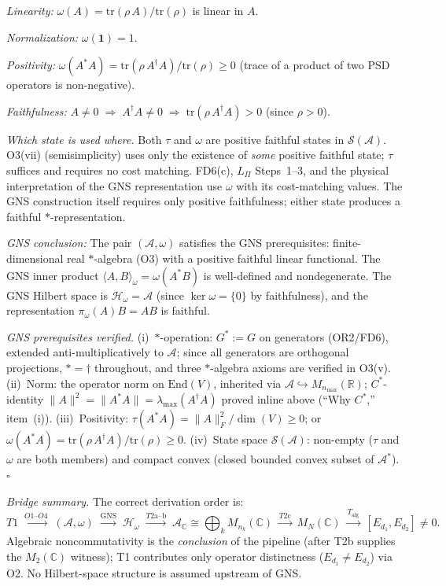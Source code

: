 \documentclass[11pt]{article}
\theoremstyle{remark}
\begin{document}
\textit{Linearity:} $\omega(A) = \mathrm{tr}(\rho\, A)/\mathrm{tr}(\rho)$ is linear in $A$.

\textit{Normalization:} $\omega(\mathbf{1}) = 1$.

\textit{Positivity:}  $\omega(A^*A) = \mathrm{tr}(\rho\, A^\dagger A)/\mathrm{tr}(\rho) \ge 0$ (trace of a product of two PSD operators is non-negative).

\textit{Faithfulness:}  $A \ne 0 \;\Rightarrow\; A^\dagger A \ne 0 \;\Rightarrow\; \mathrm{tr}(\rho\, A^\dagger A) > 0$ (since $\rho > 0$).

\smallskip\noindent\textit{Which state is used where.}  Both $\tau$ and $\omega$ are positive faithful states in $\mathcal{S}(\mathcal{A})$.  O3(vii) (semisimplicity) uses only the existence of \emph{some} positive faithful state; $\tau$ suffices and requires no cost matching.  FD6(c), $L_\Pi$ Steps~1--3, and the physical interpretation of the GNS representation use $\omega$ with its cost-matching values.  The GNS construction itself requires only positive faithfulness; either state produces a faithful $*$-representation.

\textit{GNS conclusion:} The pair $(\mathcal{A}, \omega)$ satisfies the GNS
prerequisites: finite-dimensional real $*$-algebra (O3) with a positive faithful
linear functional.  The GNS inner product $\langle A, B\rangle_\omega = \omega(A^* B)$
is well-defined and nondegenerate.  The GNS Hilbert space is
$\mathcal{H}_\omega = \mathcal{A}$ (since $\ker\omega = \{0\}$ by faithfulness),
and the representation $\pi_\omega(A)B = AB$ is faithful.

\smallskip\noindent\textit{GNS prerequisites verified.}  (i)~$*$-operation: $G^* := G$ on generators (OR2/FD6), extended anti-multiplicatively to $\mathcal{A}$; since all generators are orthogonal projections, $* = \dagger$ throughout, and three $*$-algebra axioms are verified in O3(v).  (ii)~Norm: the operator norm on $\mathrm{End}(V)$, inherited via $\mathcal{A} \hookrightarrow M_{n_{\max}}(\mathbb{R})$; $C^*$-identity $\|A\|^2 = \|A^*A\| = \lambda_{\max}(A^\dagger A)$ proved inline above (``Why $C^*$,'' item~(i)).  (iii)~Positivity: $\tau(A^*A) = \|A\|_F^2/\dim(V) \ge 0$; or $\omega(A^*A) = \mathrm{tr}(\rho\, A^\dagger A)/\mathrm{tr}(\rho) \ge 0$.  (iv)~State space $\mathcal{S}(\mathcal{A})$: non-empty ($\tau$ and $\omega$ are both members) and compact convex (closed bounded convex subset of $\mathcal{A}^*$).  \hfill$\square$

\smallskip\noindent\textit{Bridge summary.}  The correct derivation order is:
\[
T1 \;\xrightarrow{O1\text{--}O4}\; (\mathcal{A}, \omega) \;\xrightarrow{\mathrm{GNS}}\; \mathcal{H}_\omega
\;\xrightarrow{T2\mathrm{a\text{--}b}}\; \mathcal{A}_\mathbb{C} \cong {\textstyle\bigoplus_k} M_{n_k}(\mathbb{C})
\;\xrightarrow{T2\mathrm{c}}\; M_N(\mathbb{C}) \;\xrightarrow{T_{\mathrm{alg}}}\; [E_{d_1},E_{d_2}] \ne 0.
\]
Algebraic noncommutativity is the \emph{conclusion} of the pipeline (after T2b supplies the $M_2(\mathbb{C})$ witness); T1 contributes only operator distinctness ($E_{d_1} \ne E_{d_2}$) via O2.  No Hilbert-space structure is assumed upstream of GNS.
\end{document}
